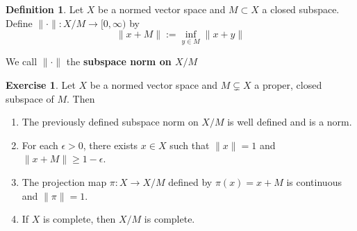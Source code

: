 \documentclass[12pt]{amsart}
\theoremstyle{definition}
\newtheorem{defn}[definition]{Definition}
\theoremstyle{remark}
\theoremstyle{definition}
\newtheorem{ex}[definition]{Exercise}
\newcommand{\ep}{\epsilon}
\newcommand{\Rg}{[0,\infty)}
\begin{document}
	\begin{defn}
		Let $X$ be a normed vector space and $M \subset X$ a closed subspace. Define $\|\cdot\|:X/M \rightarrow \Rg$ by $$\|x+M\| := \inf_{y \in M}\|x+y\|$$
		
		We call $\|\cdot\|$ the \textbf{subspace norm on $X/M$}
	\end{defn}
	
	\begin{ex}
		Let $X$ be a normed vector space and $M \subsetneq X$ a proper, closed subspace of $M$. 
		Then 
		\begin{enumerate}
			\item The previously defined subspace norm on $X/M$ is well defined and is a norm. 
			\item For each $\ep > 0$, there exists $x \in X$ such that $\|x\|=1$ and $\|x+M\| \geq 1-\ep$.
			\item The projection map $\pi:X \rightarrow X/M$ defined by $\pi(x) = x+M$ is continuous and $\|\pi\|=1$. 
			\item If $X$ is complete, then $X/M$ is complete. 
		\end{enumerate} 
	\end{ex}
	
\end{document}
